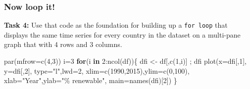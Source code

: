 \documentclass[
]{book}
\newenvironment{Shaded}{\begin{snugshade}}{\end{snugshade}}
\newcommand{\AttributeTok}[1]{\textcolor[rgb]{0.77,0.63,0.00}{#1}}
\newcommand{\ControlFlowTok}[1]{\textcolor[rgb]{0.13,0.29,0.53}{\textbf{#1}}}
\newcommand{\DecValTok}[1]{\textcolor[rgb]{0.00,0.00,0.81}{#1}}
\newcommand{\FunctionTok}[1]{\textcolor[rgb]{0.00,0.00,0.00}{#1}}
\newcommand{\NormalTok}[1]{#1}
\newcommand{\OtherTok}[1]{\textcolor[rgb]{0.56,0.35,0.01}{#1}}
\newcommand{\SpecialCharTok}[1]{\textcolor[rgb]{0.00,0.00,0.00}{#1}}
\newcommand{\StringTok}[1]{\textcolor[rgb]{0.31,0.60,0.02}{#1}}
\begin{document}
\hypertarget{now-loop-it}{%
\subsubsection*{Now loop it!}\label{now-loop-it}}

\textbf{Task 4:} Use that code as the foundation for building up a \texttt{for\ loop} that displays the same time series for every country in the dataset on a multi-pane graph that with 4 rows and 3 columns.

\begin{Shaded}
\begin{Highlighting}[]
\FunctionTok{par}\NormalTok{(}\AttributeTok{mfrow=}\FunctionTok{c}\NormalTok{(}\DecValTok{4}\NormalTok{,}\DecValTok{3}\NormalTok{))}
\NormalTok{i}\OtherTok{=}\DecValTok{3}
\ControlFlowTok{for}\NormalTok{(i }\ControlFlowTok{in} \DecValTok{2}\SpecialCharTok{:}\FunctionTok{ncol}\NormalTok{(df))\{}
\NormalTok{  dfi }\OtherTok{\textless{}{-}}\NormalTok{ df[,}\FunctionTok{c}\NormalTok{(}\DecValTok{1}\NormalTok{,i)] ; dfi}
  \FunctionTok{plot}\NormalTok{(}\AttributeTok{x=}\NormalTok{dfi[,}\DecValTok{1}\NormalTok{],}
       \AttributeTok{y=}\NormalTok{dfi[,}\DecValTok{2}\NormalTok{],}
       \AttributeTok{type=}\StringTok{"l"}\NormalTok{,}\AttributeTok{lwd=}\DecValTok{2}\NormalTok{,}
       \AttributeTok{xlim=}\FunctionTok{c}\NormalTok{(}\DecValTok{1990}\NormalTok{,}\DecValTok{2015}\NormalTok{),}\AttributeTok{ylim=}\FunctionTok{c}\NormalTok{(}\DecValTok{0}\NormalTok{,}\DecValTok{100}\NormalTok{),}
       \AttributeTok{xlab=}\StringTok{"Year"}\NormalTok{,}\AttributeTok{ylab=}\StringTok{"\% renewable"}\NormalTok{,}
       \AttributeTok{main=}\FunctionTok{names}\NormalTok{(dfi)[}\DecValTok{2}\NormalTok{])}
\NormalTok{\}}
\end{Highlighting}
\end{Shaded}
\end{document}

